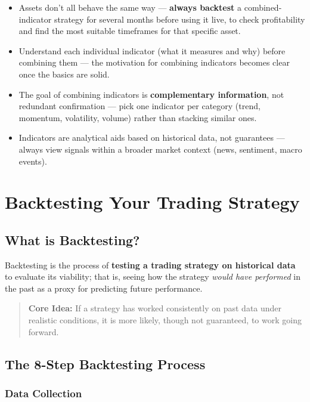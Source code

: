 \documentclass[12pt,openany]{book}
\begin{document}
\begin{itemize}[leftmargin=*]
    \item Assets don't all behave the same way --- \textbf{always backtest} a combined-indicator strategy for several months before using it live, to check profitability and find the most suitable timeframes for that specific asset.
    \item Understand each individual indicator (what it measures and why) before combining them --- the motivation for combining indicators becomes clear once the basics are solid.
    \item The goal of combining indicators is \textbf{complementary information}, not redundant confirmation --- pick one indicator per category (trend, momentum, volatility, volume) rather than stacking similar ones.
    \item Indicators are analytical aids based on historical data, not guarantees --- always view signals within a broader market context (news, sentiment, macro events).
\end{itemize}

\section{Backtesting Your Trading Strategy}

\subsection{What is Backtesting?}

Backtesting is the process of \textbf{testing a trading strategy on historical data} to evaluate its viability; that is, seeing how the strategy \emph{would have performed} in the past as a proxy for predicting future performance.

\begin{quote}
    \textbf{Core Idea:} If a strategy has worked consistently on past data under realistic conditions, it is more likely, though not guaranteed, to work going forward.
\end{quote}

\subsection{The 8-Step Backtesting Process}

\subsubsection{Data Collection}
\end{document}
